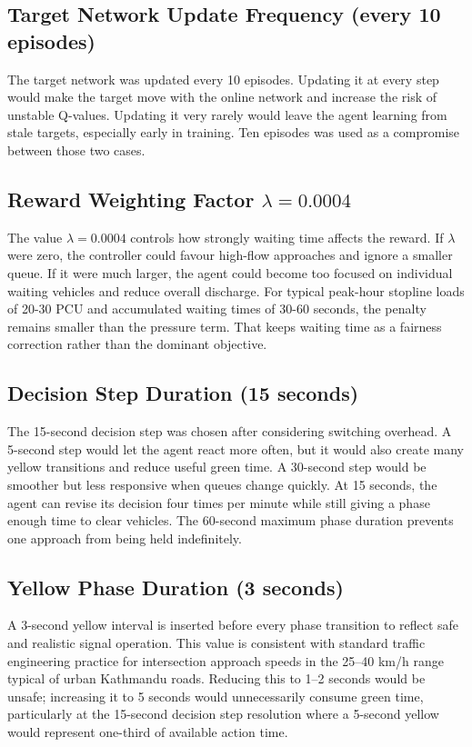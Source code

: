 \subsection{Target Network Update Frequency (every 10 episodes)}

The target network was updated every 10 episodes. Updating it at every
step would make the target move with the online network and increase the
risk of unstable Q-values. Updating it very rarely would leave the agent
learning from stale targets, especially early in training. Ten episodes
was used as a compromise between those two cases.

\subsection{Reward Weighting Factor \( \lambda = 0.0004 \)}

The value \( \lambda = 0.0004 \) controls how strongly waiting time
affects the reward. If \( \lambda \) were zero, the controller could
favour high-flow approaches and ignore a smaller queue. If it were much
larger, the agent could become too focused on individual waiting vehicles
and reduce overall discharge. For typical peak-hour stopline loads of
20-30 PCU and accumulated waiting times of 30-60 seconds, the penalty
remains smaller than the pressure term. That keeps waiting time as a
fairness correction rather than the dominant objective.

\subsection{Decision Step Duration (15 seconds)}

The 15-second decision step was chosen after considering switching
overhead. A 5-second step would let the agent react more often, but it
would also create many yellow transitions and reduce useful green time.
A 30-second step would be smoother but less responsive when queues change
quickly. At 15 seconds, the agent can revise its decision four times per
minute while still giving a phase enough time to clear vehicles. The
60-second maximum phase duration prevents one approach from being held
indefinitely.

\subsection{Yellow Phase Duration (3 seconds)}

A 3-second yellow interval is inserted before every phase transition to reflect safe and realistic signal operation. This value is consistent with standard traffic engineering practice for intersection approach speeds in the 25–40 km/h range typical of urban Kathmandu roads. Reducing this to 1–2 seconds would be unsafe; increasing it to 5 seconds would unnecessarily consume green time, particularly at the 15-second decision step resolution where a 5-second yellow would represent one-third of available action time.

